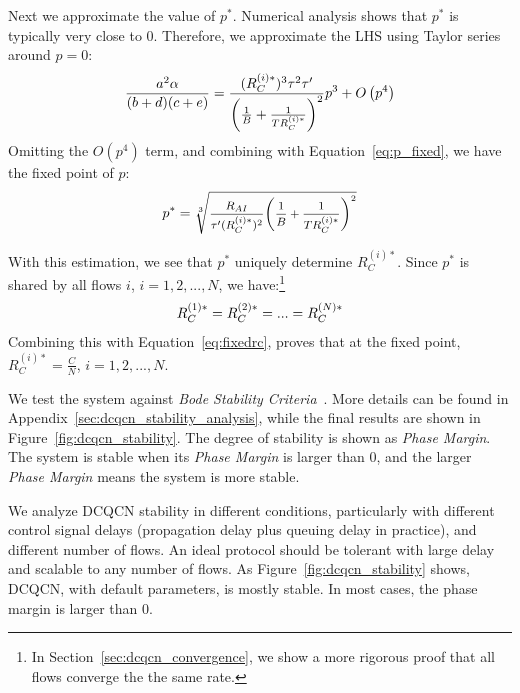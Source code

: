 Next we approximate the value of $p^*$. Numerical analysis shows that $p^*$ is 
typically very close to 0. Therefore, we approximate the LHS using Taylor series around $p=0$:
\begin{equation}
\small
\frac{{{a^2}\alpha }}{{(b + d)(c + e)}} = \frac{{(R_C^{(i)*})^3{\tau ^2}\tau '}}{{{{\left( {\frac{1}{B} + \frac{1}{{TR_C^{(i)*}}}} \right)}^2}}}{p^3} + O\left( {{p^4}} \right)
\end{equation}
Omitting the $O(p^4)$ term, and combining with Equation~\ref{eq:p_fixed}, we have the fixed point of $p$:
\begin{equation}
\small
{p^*} = \sqrt[3]{{\frac{{{R_{AI}}}}{{{\tau '}(R_C^{(i)*})^2}}{{\left( {\frac{1}{B} + \frac{1}{TR_C^{(i)*}}} \right)}^2}}}
\label{eq:fixedp}
\end{equation}

With this estimation, we see that $p^*$ uniquely determine $R_C^{(i)*}$. 
Since $p^*$ is shared by all flows $i$, $i = 1, 2, ..., N$, we have:\footnote{In 
Section~\ref{sec:dcqcn_convergence}, we show a more rigorous proof that all flows
converge the the same rate.}
\begin{equation}
\small
R_C^{(1)*} = R_C^{(2)*} = ... = R_C^{(N)*}
\end{equation}
Combining this with Equation~\ref{eq:fixedrc}, proves that at the fixed point, $R_C^{(i)*} = \frac{C}{N}$, 
$i = 1, 2, ..., N$.

We test the system against {\em Bode Stability Criteria}~\cite{controltheory}. 
More details can be found in Appendix~\ref{sec:dcqcn_stability_analysis},
while the final results are shown in
Figure~\ref{fig:dcqcn_stability}.  The degree of stability is shown as {\em
Phase Margin}. The system is stable when its {\em Phase Margin} is larger than
0, and the larger {\em Phase Margin} means the system is more stable.

We analyze DCQCN stability in different conditions, particularly with different
control signal delays (propagation delay plus queuing delay in practice), and
different number of flows. An ideal protocol should be tolerant with large delay
and scalable to any number of flows. As Figure~\ref{fig:dcqcn_stability} shows,
DCQCN, with default parameters, is mostly stable. In most cases, the phase
margin is larger than 0.

